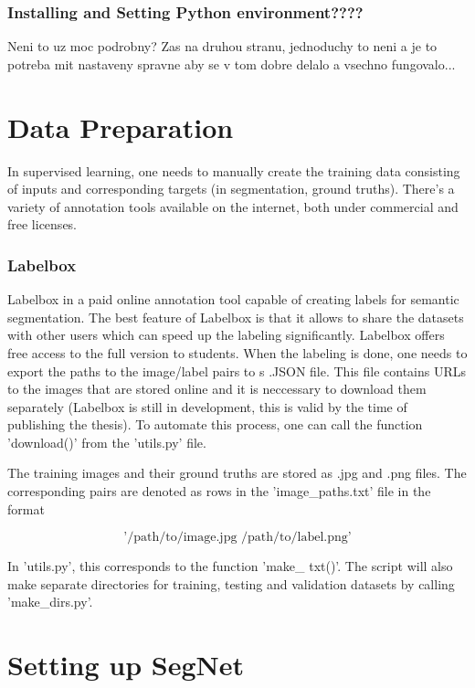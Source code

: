 \subsubsection{Installing and Setting Python environment????}

Neni to uz moc podrobny? Zas na druhou stranu, jednoduchy to neni a je to potreba mit nastaveny spravne aby se v tom dobre delalo a vsechno fungovalo...

\section{Data Preparation}

In supervised learning, one needs to manually create the training data consisting of inputs and corresponding targets (in segmentation, ground truths). There's a variety of annotation tools available on the internet, both under commercial and free licenses. 

\subsubsection{Labelbox}

Labelbox in a paid online annotation tool capable of creating labels for semantic segmentation. The best feature of Labelbox is that it allows to share the datasets with other users which can speed up the labeling significantly. Labelbox offers free access to the full version to students. When the labeling is done, one needs to export the paths to the image/label pairs to s .JSON file. This file contains URLs to the images that are stored online and it is neccessary to download them separately (Labelbox is still in development, this is valid by the time of publishing the thesis). To automate this process, one can call the function 'download()' from the 'utils.py' file. 

The training images and their ground truths are stored as .jpg and .png files. The corresponding pairs are denoted as rows in the 'image\_paths.txt' file in the format 

$$
\text{'/path/to/image.jpg /path/to/label.png'}
$$

In 'utils.py', this corresponds to the function 'make\_ txt()'. The script will also make separate directories for training, testing and validation datasets by calling 'make\_dirs.py'.

\section{Setting up SegNet}

